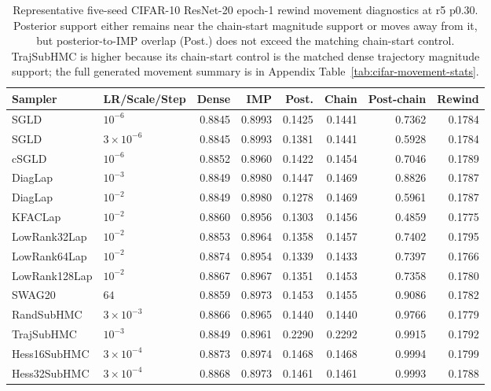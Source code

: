 \documentclass{article}
\newcommand{\cifarmovementappendixref}{Appendix Table~\ref{tab:cifar-movement-stats}}
\newcommand{\cifarmovementappendixref}{the supplemental generated movement table}
\begin{document}
\begin{table}[t]
\centering
\small
\setlength{\tabcolsep}{3.5pt}
\begin{tabular}{llrrrrrr}
\toprule
Sampler & LR/Scale/Step & Dense & IMP & Post. & Chain & Post-chain & Rewind \\
\midrule
SGLD & $10^{-6}$ & 0.8845 & 0.8993 & 0.1425 & 0.1441 & 0.7362 & 0.1784 \\
SGLD & $3{\times}10^{-6}$ & 0.8845 & 0.8993 & 0.1381 & 0.1441 & 0.5928 & 0.1784 \\
cSGLD & $10^{-6}$ & 0.8852 & 0.8960 & 0.1422 & 0.1454 & 0.7046 & 0.1789 \\
DiagLap & $10^{-3}$ & 0.8849 & 0.8980 & 0.1447 & 0.1469 & 0.8826 & 0.1787 \\
DiagLap & $10^{-2}$ & 0.8849 & 0.8980 & 0.1278 & 0.1469 & 0.5961 & 0.1787 \\
KFACLap & $10^{-2}$ & 0.8860 & 0.8956 & 0.1303 & 0.1456 & 0.4859 & 0.1775 \\
LowRank32Lap & $10^{-2}$ & 0.8853 & 0.8964 & 0.1358 & 0.1457 & 0.7402 & 0.1795 \\
LowRank64Lap & $10^{-2}$ & 0.8874 & 0.8954 & 0.1339 & 0.1433 & 0.7397 & 0.1766 \\
LowRank128Lap & $10^{-2}$ & 0.8867 & 0.8967 & 0.1351 & 0.1453 & 0.7358 & 0.1780 \\
SWAG20 & $64$ & 0.8859 & 0.8973 & 0.1453 & 0.1455 & 0.9086 & 0.1782 \\
RandSubHMC & $3{\times}10^{-3}$ & 0.8866 & 0.8965 & 0.1440 & 0.1440 & 0.9766 & 0.1779 \\
TrajSubHMC & $10^{-3}$ & 0.8849 & 0.8961 & 0.2290 & 0.2292 & 0.9915 & 0.1792 \\
Hess16SubHMC & $3{\times}10^{-4}$ & 0.8873 & 0.8974 & 0.1468 & 0.1468 & 0.9994 & 0.1799 \\
Hess32SubHMC & $3{\times}10^{-4}$ & 0.8868 & 0.8973 & 0.1461 & 0.1461 & 0.9993 & 0.1788 \\
\bottomrule
\end{tabular}
\caption{Representative five-seed CIFAR-10 ResNet-20 epoch-1 rewind movement
diagnostics at r5 p0.30. Posterior support either remains near the chain-start
magnitude support or moves away from it, but posterior-to-IMP overlap (Post.)
does not exceed the matching chain-start control. TrajSubHMC is higher because
its chain-start control is the matched dense trajectory magnitude support; the
full generated movement summary is in \cifarmovementappendixref.}
\label{tab:cifar-long-movement}
\end{table}
\end{document}
